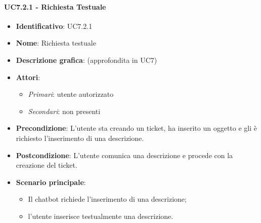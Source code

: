   \paragraph{UC7.2.1 - Richiesta Testuale}
  \begin{itemize}
     \item \textbf{Identificativo}: UC7.2.1
     \item \textbf{Nome}: Richiesta testuale
     \item \textbf{Descrizione grafica}: (approfondita in UC7)
     \item \textbf{Attori}:
     \begin{itemize} 
         \item \textit{Primari}: utente autorizzato
         \item \textit{Secondari}: non presenti
     \end{itemize}
         \item \textbf{Precondizione}: L'utente sta creando un ticket, ha inserito un oggetto e gli è richiesto l'inserimento di una descrizione.
         \item \textbf{Postcondizione}: L'utente comunica una descrizione e procede con la creazione del ticket. 
      \item \textbf{Scenario principale}: 
         \begin{itemize}
             \item Il chatbot richiede l'inserimento di una descrizione;
             \item l'utente inserisce testualmente una descrizione.
         \end{itemize}
  \end{itemize}
  
